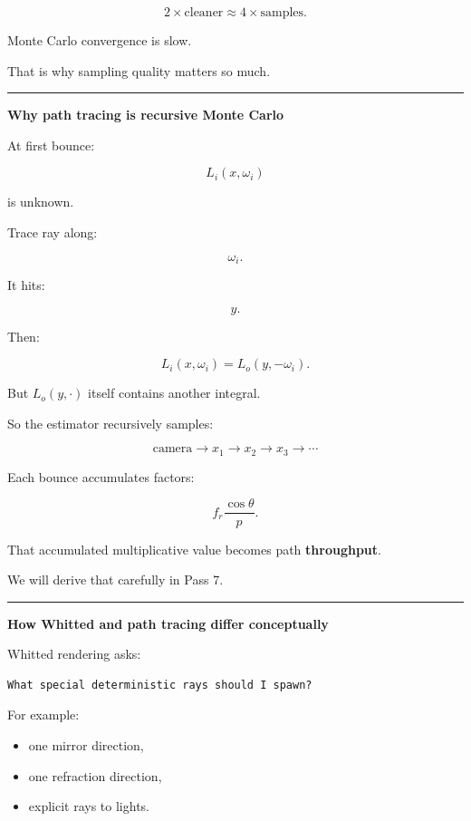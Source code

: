 \[
\boxed{
2\times \text{cleaner}
\approx
4\times\text{samples}.
}
\]

Monte Carlo convergence is slow.

That is why sampling quality matters so much.

\begin{center}\rule{0.5\linewidth}{0.5pt}\end{center}

\textbf{Why path tracing is recursive Monte Carlo}

At first bounce:

\[
L_i(x,\omega_i)
\]

is unknown.

Trace ray along:

\[
\omega_i.
\]

It hits:

\[
y.
\]

Then:

\[
L_i(x,\omega_i)
=
L_o(y,-\omega_i).
\]

But \(L_o(y,\cdot)\) itself contains another integral.

So the estimator recursively samples:

\[
\text{camera}
\rightarrow
x_1
\rightarrow
x_2
\rightarrow
x_3
\rightarrow\cdots
\]

Each bounce accumulates factors:

\[
f_r
\frac{\cos\theta}{p}.
\]

That accumulated multiplicative value becomes path \textbf{throughput}.

We will derive that carefully in Pass 7.

\begin{center}\rule{0.5\linewidth}{0.5pt}\end{center}

\textbf{How Whitted and path tracing differ conceptually}

Whitted rendering asks:

\begin{verbatim}
What special deterministic rays should I spawn?
\end{verbatim}

For example:

\begin{itemize}
\tightlist
\item
  one mirror direction,
\item
  one refraction direction,
\item
  explicit rays to lights.
\end{itemize}

